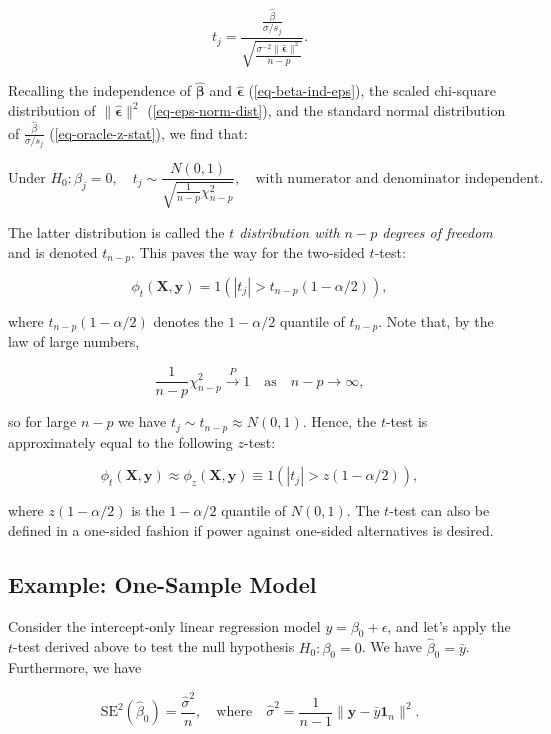 \documentclass[
  11pt,
  letterpaper,
  oneside]{book}
\theoremstyle{definition}
\theoremstyle{plain}
\theoremstyle{plain}
\theoremstyle{plain}
\theoremstyle{remark}
\begin{document}
\[
t_j = \frac{\frac{\widehat{\beta}}{\sigma/s_j}}{\sqrt{\frac{\sigma^{-2}\|\boldsymbol{\widehat{\epsilon}}\|^2}{n-p}}}.
\]

Recalling the independence of \(\boldsymbol{\widehat{\beta}}\) and
\(\boldsymbol{\widehat{\epsilon}}\) (\ref{eq-beta-ind-eps}), the scaled
chi-square distribution of \(\|\boldsymbol{\widehat{\epsilon}}\|^2\)
(\ref{eq-eps-norm-dist}), and the standard normal distribution of
\(\frac{\widehat{\beta}}{\sigma/s_j}\) (\ref{eq-oracle-z-stat}), we find
that:

\[
\text{Under } H_0:\beta_j = 0, \quad t_j \sim \frac{N(0,1)}{\sqrt{\frac{1}{n-p}\chi^2_{n-p}}}, \quad \text{with numerator and denominator independent.}
\]

The latter distribution is called the \emph{\(t\) distribution with
\(n-p\) degrees of freedom} and is denoted \(t_{n-p}\). This paves the
way for the two-sided \(t\)-test:

\[
\phi_t(\boldsymbol{X}, \boldsymbol{y}) = 1(|t_j| > t_{n-p}(1-\alpha/2)),
\]

where \(t_{n-p}(1-\alpha/2)\) denotes the \(1-\alpha/2\) quantile of
\(t_{n-p}\). Note that, by the law of large numbers,

\[
\frac{1}{n-p}\chi^2_{n-p} \overset{P}{\rightarrow} 1 \quad \text{as} \quad n - p \rightarrow \infty,
\]

so for large \(n-p\) we have \(t_{j} \sim t_{n-p} \approx N(0,1)\).
Hence, the \(t\)-test is approximately equal to the following
\(z\)-test:

\[
\phi_t(\boldsymbol{X}, \boldsymbol{y}) \approx \phi_z(\boldsymbol{X}, \boldsymbol{y}) \equiv 1(|t_j| > z(1-\alpha/2)),
\]

where \(z(1-\alpha/2)\) is the \(1-\alpha/2\) quantile of \(N(0,1)\).
The \(t\)-test can also be defined in a one-sided fashion if power
against one-sided alternatives is desired.

\hypertarget{example-one-sample-model}{%
\subsection{Example: One-Sample Model}\label{example-one-sample-model}}

Consider the intercept-only linear regression model
\(y = \beta_0 + \epsilon\), and let's apply the \(t\)-test derived above
to test the null hypothesis \(H_0: \beta_0 = 0\). We have
\(\widehat{\beta}_0 = \bar{y}\). Furthermore, we have

\[
\text{SE}^2(\widehat{\beta}_0) = \frac{\widehat{\sigma}^2}{n}, \quad \text{where} \quad \widehat{\sigma}^2 = \frac{1}{n-1}\|\boldsymbol{y} - \bar{y} \boldsymbol{1}_n\|^2.
\]
\end{document}
